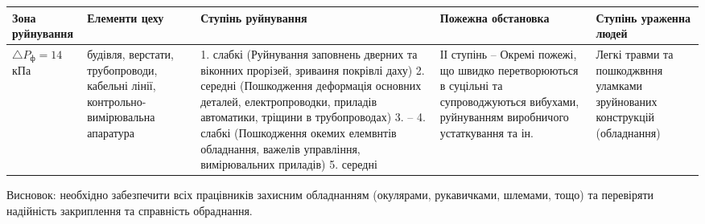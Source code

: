 \documentclass[a4paper,14pt]{extreport}
\begin{document}
\begin{landscape}








\begin{center}
  \begin{longtable}{|p{100pt}|p{130pt}|p{170pt}|p{140pt}|p{110pt}|}
   \hline
   Зона руйнування & Елементи цеху & Ступінь руйнування & Пожежна обстановка  & Ступінь ураженна людей\\
   \hline

   $\triangle P_{\text{ф}} = 14$ кПа & будівля, верстати, трубопроводи, кабельні лінії, контрольно-вимірювальна апаратура & 1. слабкі (Руйнування заповнень дверних та віконних прорізей, зриваиня покрівлі даху) 2. середні (Пошкодження деформація основних деталей, електропроводки, приладів автоматики, тріщини в трубопроводах) 3. --  4. слабкі (Пошкодження окемих елемвнтів обладнання, важелів управління, вимірювальних приладів) 5. середні  & ІІ ступінь -- Окремі пожежі, що швидко перетворюються в суцільні та супроводжуються вибухами, руйнуванням виробничого устаткування та ін. & Легкі травми та пошкоджвння уламками зруйнованих конструкцій (обладнання)\\
   \hline

   \end{longtable}
   \end{center}

\end{landscape}


Висновок: необхідно забезпечити всіх працівників захисним обладнанням (окулярами, рукавичками, шлемами, тощо) та перевіряти надійність закриплення та справність обраднання.
\end{document}
